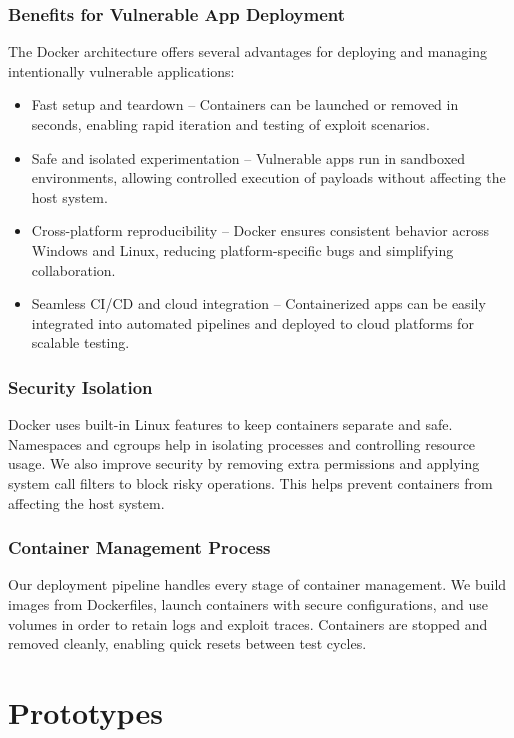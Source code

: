 \documentclass[12pt]{article}
\begin{document}
\subsubsection{Benefits for Vulnerable App Deployment}
The Docker architecture offers several advantages for deploying and managing intentionally vulnerable applications:
  \begin{itemize}
    \item {Fast setup and teardown} – Containers can be launched or removed in seconds, enabling rapid iteration and testing of exploit scenarios.
    \item {Safe and isolated experimentation} – Vulnerable apps run in sandboxed environments, allowing controlled execution of payloads without affecting the host system.
    \item {Cross-platform reproducibility} – Docker ensures consistent behavior across Windows and Linux, reducing platform-specific bugs and simplifying collaboration.
    \item {Seamless CI/CD and cloud integration} – Containerized apps can be easily integrated into automated pipelines and deployed to cloud platforms for scalable testing.
  \end{itemize}

\subsubsection{Security Isolation}
Docker uses built-in Linux features to keep containers separate and safe. Namespaces and cgroups help in isolating processes and controlling resource usage. We also improve security by removing extra permissions and applying system call filters to block risky operations. This helps prevent containers from affecting the host system.

\subsubsection{Container Management Process}
Our deployment pipeline handles every stage of container management. We build images from Dockerfiles, launch containers with secure configurations, and use volumes in order to retain logs and exploit traces. Containers are stopped and removed cleanly, enabling quick resets between test cycles.

\section{Prototypes}

\end{document}
